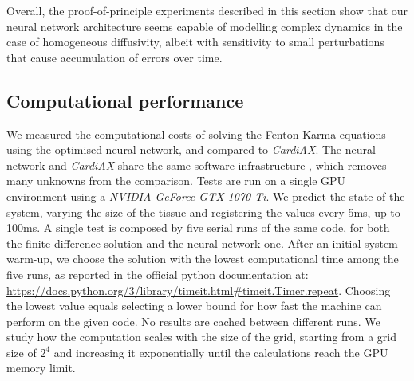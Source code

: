 \documentclass[utf8]{frontiers_suppmat} %
\begin{document}
Overall, the proof-of-principle experiments described in this section show that our neural network architecture seems capable of modelling complex dynamics in the case of homogeneous diffusivity, albeit with sensitivity to small perturbations that cause accumulation of errors over time.



\subsection{Computational performance}
We measured the computational costs of solving the Fenton-Karma equations using the optimised neural network, and compared to \textit{CardiAX}.
The neural network and \textit{CardiAX} share the same software infrastructure \cite[]{jax2018github}, which removes many unknowns from the comparison.
Tests are run on a single GPU environment using a \textit{NVIDIA GeForce GTX 1070 Ti}.
We predict the state of the system, varying the size of the tissue and registering the values every 5ms, up to 100ms.
A single test is composed by five serial runs of the same code, for both the finite difference solution and the neural network one.
After an initial system warm-up, we choose the solution with the lowest computational time among the five runs, as reported in the official python documentation \cite[]{10.5555/1593511} at: \url{https://docs.python.org/3/library/timeit.html#timeit.Timer.repeat}. Choosing the lowest value equals selecting a lower bound for how fast the machine can perform on the given code.
No results are cached between different runs.
We study how the computation scales with the size of the grid, starting from a grid size of $2^4$ and increasing it exponentially until the calculations reach the GPU memory limit.
\end{document}
